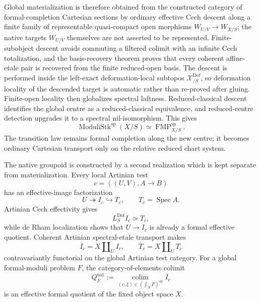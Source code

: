 Global materialization is therefore obtained from the constructed category of
formal-completion Cartesian sections by ordinary effective Cech descent along
a finite family of representable quasi-compact open morphisms
$W_{U/V}\to W_{X/S}$; the native targets $W_{U/V}$ themselves are not
asserted to be represented.  Finite-subobject descent avoids commuting a
filtered colimit with an infinite Cech totalization, and the basis-recovery
theorem proves that every coherent affine-etale pair is recovered from the
finite reduced-open basis.  The descent is performed
inside the left-exact deformation-local subtopos
$\mathcal X^{\mathrm{Def}}_{/S}$, so deformation locality of the descended
target is automatic rather than re-proved after gluing.  Finite-open locality
then globalizes spectral laftness.  Reduced-classical descent identifies the
global centre as a reduced-classical equivalence, and reduced-centre detection
upgrades it to a spectral nil-isomorphism.  This gives
\[
\boxed{
    \operatorname{ModuliStk}^{\mathrm{sp}}(X/S)
    \simeq
    \operatorname{FMP}^{\mathrm{sp}}_{X/S}.}
\]
The transition law remains formal completion along the new centre; it becomes
ordinary Cartesian transport only on the relative reduced chart system.

The native groupoid is constructed by a second realization which is kept
separate from materialization.  Every local Artinian test
\[
    c=((U,V),A\to B)
\]
has an effective-image factorization
\[
    U\twoheadrightarrow I_c\hookrightarrow T_c,
    \qquad T_c=\operatorname{Spec}A.
\]
Artinian Cech effectivity gives
\[
    L_S^{\mathrm{Def}}I_c
    \simeq
    T_c,
\]
while de Rham localization shows that $U\to I_c$ is already a formal
effective quotient.  Coherent Artinian spectral-etale transport makes
\[
    \overline I_c
    =
    X\amalg_UI_c,
    \qquad
    \overline T_c
    =
    X\amalg_UT_c
\]
contravariantly functorial on the global Artinian test category.  For a global
formal-moduli problem $F$, the category-of-elements colimit
\[
\boxed{
    Q_F^{\mathrm{nat}}
    :=
    \operatorname*{colim}_{(c,\xi)\in(\int_XF)^{\mathrm{op}}}
    \overline I_c}
\]
is an effective formal quotient of the fixed object space $X$.

